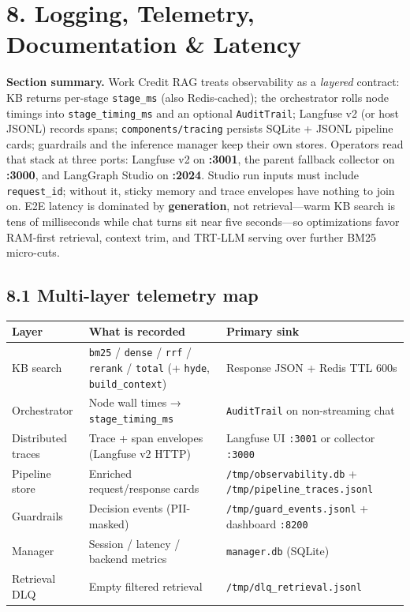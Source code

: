 \section{8. Logging, Telemetry, Documentation \& Latency}\label{logging-telemetry-documentation-latency}

\textbf{Section summary.} Work Credit RAG treats observability as a \emph{layered} contract: KB returns per-stage \texttt{stage\_ms} (also Redis-cached); the orchestrator rolls node timings into \texttt{stage\_timing\_ms} and an optional \texttt{AuditTrail}; Langfuse v2 (or host JSONL) records spans; \texttt{components/tracing} persists SQLite + JSONL pipeline cards; guardrails and the inference manager keep their own stores. Operators read that stack at three ports: Langfuse v2 on \textbf{:3001}, the parent fallback collector on \textbf{:3000}, and LangGraph Studio on \textbf{:2024}. Studio run inputs must include \texttt{request\_id}; without it, sticky memory and trace envelopes have nothing to join on. E2E latency is dominated by \textbf{generation}, not retrieval---warm KB search is tens of milliseconds while chat turns sit near five seconds---so optimizations favor RAM-first retrieval, context trim, and TRT-LLM serving over further BM25 micro-cuts.

\subsection{8.1 Multi-layer telemetry map}\label{multi-layer-telemetry-map}

\begin{longtable}[]{@{}
  >{\raggedright\arraybackslash}p{}
  >{\raggedright\arraybackslash}p{}
  >{\raggedright\arraybackslash}p{}@{}}
\toprule\noalign{}
Layer & What is recorded & Primary sink \\
\midrule\noalign{}
\endhead
\bottomrule\noalign{}
\endlastfoot
KB search & \texttt{bm25} / \texttt{dense} / \texttt{rrf} / \texttt{rerank} / \texttt{total} (+ \texttt{hyde}, \texttt{build\_context}) & Response JSON + Redis TTL 600s \\
Orchestrator & Node wall times → \texttt{stage\_timing\_ms} & \texttt{AuditTrail} on non-streaming chat \\
Distributed traces & Trace + span envelopes (Langfuse v2 HTTP) & Langfuse UI \texttt{:3001} or collector \texttt{:3000} \\
Pipeline store & Enriched request/response cards & \texttt{/tmp/observability.db} + \texttt{/tmp/pipeline\_traces.jsonl} \\
Guardrails & Decision events (PII-masked) & \texttt{/tmp/guard\_events.jsonl} + dashboard \texttt{:8200} \\
Manager & Session / latency / backend metrics & \texttt{manager.db} (SQLite) \\
Retrieval DLQ & Empty filtered retrieval & \texttt{/tmp/dlq\_retrieval.jsonl} \\
\end{longtable}

